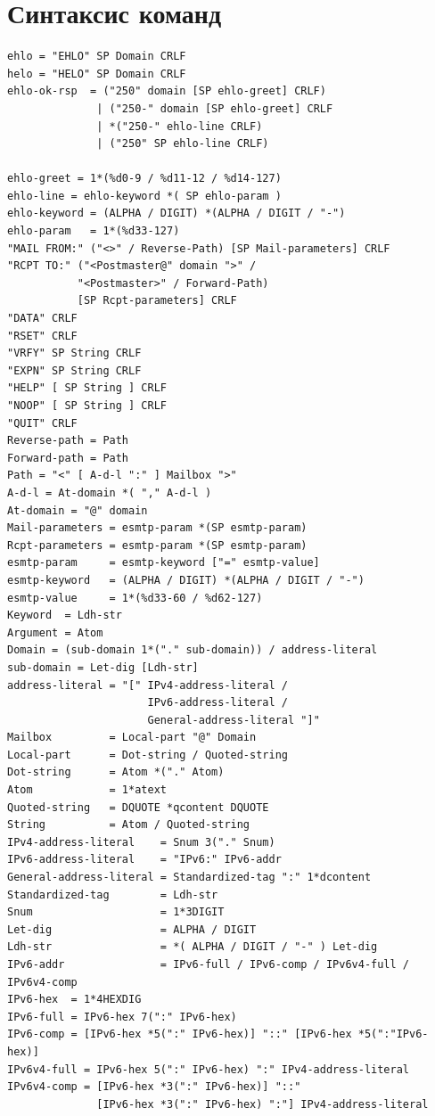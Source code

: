 \documentclass[a4paper,12pt]{report}
\begin{document}
	 \section{Синтаксис команд}\label{section:smtp_syntax}
	 \begin{verbatim}
ehlo = "EHLO" SP Domain CRLF
helo = "HELO" SP Domain CRLF
ehlo-ok-rsp  = ("250" domain [SP ehlo-greet] CRLF)
              | ("250-" domain [SP ehlo-greet] CRLF
              | *("250-" ehlo-line CRLF)
              | ("250" SP ehlo-line CRLF)

ehlo-greet = 1*(%d0-9 / %d11-12 / %d14-127)
ehlo-line = ehlo-keyword *( SP ehlo-param )
ehlo-keyword = (ALPHA / DIGIT) *(ALPHA / DIGIT / "-")
ehlo-param   = 1*(%d33-127)
"MAIL FROM:" ("<>" / Reverse-Path) [SP Mail-parameters] CRLF
"RCPT TO:" ("<Postmaster@" domain ">" /
           "<Postmaster>" / Forward-Path) 
           [SP Rcpt-parameters] CRLF
"DATA" CRLF
"RSET" CRLF
"VRFY" SP String CRLF
"EXPN" SP String CRLF
"HELP" [ SP String ] CRLF
"NOOP" [ SP String ] CRLF
"QUIT" CRLF
Reverse-path = Path
Forward-path = Path
Path = "<" [ A-d-l ":" ] Mailbox ">"
A-d-l = At-domain *( "," A-d-l )
At-domain = "@" domain
Mail-parameters = esmtp-param *(SP esmtp-param)
Rcpt-parameters = esmtp-param *(SP esmtp-param)
esmtp-param     = esmtp-keyword ["=" esmtp-value]
esmtp-keyword   = (ALPHA / DIGIT) *(ALPHA / DIGIT / "-")
esmtp-value     = 1*(%d33-60 / %d62-127)
Keyword  = Ldh-str
Argument = Atom
Domain = (sub-domain 1*("." sub-domain)) / address-literal
sub-domain = Let-dig [Ldh-str]
address-literal = "[" IPv4-address-literal / 
                      IPv6-address-literal /
                      General-address-literal "]"
Mailbox         = Local-part "@" Domain
Local-part      = Dot-string / Quoted-string
Dot-string      = Atom *("." Atom)
Atom            = 1*atext
Quoted-string   = DQUOTE *qcontent DQUOTE
String          = Atom / Quoted-string
IPv4-address-literal    = Snum 3("." Snum)
IPv6-address-literal    = "IPv6:" IPv6-addr
General-address-literal = Standardized-tag ":" 1*dcontent
Standardized-tag        = Ldh-str
Snum                    = 1*3DIGIT
Let-dig                 = ALPHA / DIGIT
Ldh-str                 = *( ALPHA / DIGIT / "-" ) Let-dig
IPv6-addr               = IPv6-full / IPv6-comp / IPv6v4-full / IPv6v4-comp
IPv6-hex  = 1*4HEXDIG
IPv6-full = IPv6-hex 7(":" IPv6-hex)
IPv6-comp = [IPv6-hex *5(":" IPv6-hex)] "::" [IPv6-hex *5(":"IPv6-hex)]
IPv6v4-full = IPv6-hex 5(":" IPv6-hex) ":" IPv4-address-literal
IPv6v4-comp = [IPv6-hex *3(":" IPv6-hex)] "::"
              [IPv6-hex *3(":" IPv6-hex) ":"] IPv4-address-literal

	 \end{verbatim}
\end{document}

